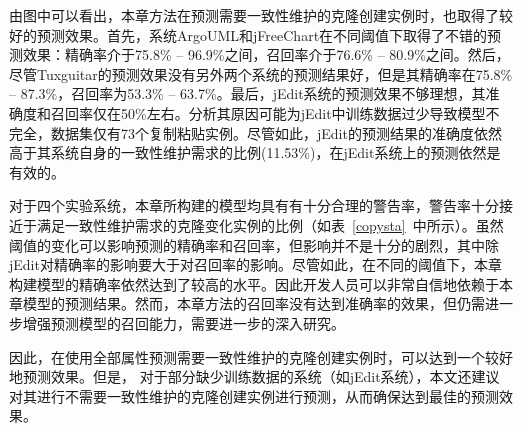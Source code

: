 由图中可以看出，本章方法在预测需要一致性维护的克隆创建实例时，也取得了较好的预测效果。首先，系统ArgoUML和jFreeChart在不同阈值下取得了不错的预测效果：精确率介于75.8\% -- 96.9\%之间，召回率介于76.6\% -- 80.9\%之间。然后，尽管Tuxguitar的预测效果没有另外两个系统的预测结果好，但是其精确率在75.8\% -- 87.3\%，召回率为53.3\% -- 63.7\%。最后，jEdit系统的预测效果不够理想，其准确度和召回率仅在50\%左右。分析其原因可能为jEdit中训练数据过少导致模型不完全，数据集仅有73个复制粘贴实例。尽管如此，jEdit的预测结果的准确度依然高于其系统自身的一致性维护需求的比例(11.53\%)，在jEdit系统上的预测依然是有效的。

对于四个实验系统，本章所构建的模型均具有有十分合理的警告率，警告率十分接近于满足一致性维护需求的克隆变化实例的比例（如表~\ref {copysta}~中所示）。虽然阈值的变化可以影响预测的精确率和召回率，但影响并不是十分的剧烈，其中除jEdit对精确率的影响要大于对召回率的影响。尽管如此，在不同的阈值下，本章构建模型的精确率依然达到了较高的水平。因此开发人员可以非常自信地依赖于本章模型的预测结果。然而，本章方法的召回率没有达到准确率的效果，但仍需进一步增强预测模型的召回能力，需要进一步的深入研究。

因此，在使用全部属性预测需要一致性维护的克隆创建实例时，可以达到一个较好地预测效果。但是， 对于部分缺少训练数据的系统（如jEdit系统），本文还建议对其进行不需要一致性维护的克隆创建实例进行预测，从而确保达到最佳的预测效果。

